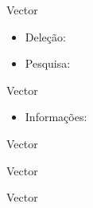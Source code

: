 \begin{frame}[fragile]{Vector}

    \begin{itemize}
        \item Deleção:
        \item Pesquisa:
    \end{itemize}

\end{frame}

\begin{frame}[fragile]{Vector}

    \begin{itemize}
        \item Informações:
    \end{itemize}

\end{frame}

\begin{frame}[fragile]{Vector}


\end{frame}

\begin{frame}[fragile]{Vector}


\end{frame}

\begin{frame}[fragile]{Vector}


\end{frame}
